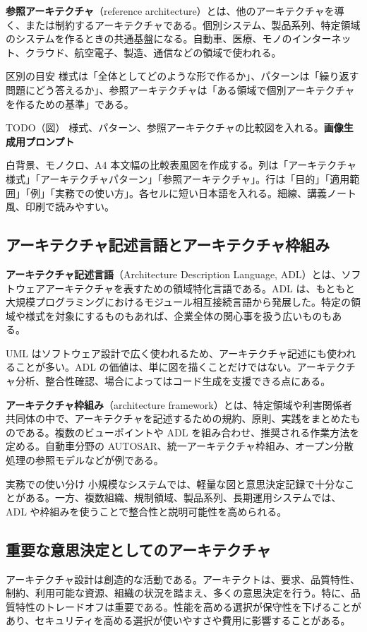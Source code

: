 \documentclass[a4paper,11pt]{ltjsarticle}
\newcommand{\todofig}[2]{\begin{statementbox}{TODO（図） #1}\textbf{画像生成用プロンプト}\par #2\end{statementbox}}
\newcommand{\keyterm}[1]{\textbf{#1}}
\newcommand{\en}[1]{（#1）}
\begin{document}
\keyterm{参照アーキテクチャ}\en{reference architecture}とは、他のアーキテクチャを導く、または制約するアーキテクチャである。個別システム、製品系列、特定領域のシステムを作るときの共通基盤になる。自動車、医療、モノのインターネット、クラウド、航空電子、製造、通信などの領域で使われる。

\begin{statementbox}{区別の目安}
様式は「全体としてどのような形で作るか」、パターンは「繰り返す問題にどう答えるか」、参照アーキテクチャは「ある領域で個別アーキテクチャを作るための基準」である。
\end{statementbox}

\todofig{様式、パターン、参照アーキテクチャの比較図を入れる。}{白背景、モノクロ、A4 本文幅の比較表風図を作成する。列は「アーキテクチャ様式」「アーキテクチャパターン」「参照アーキテクチャ」。行は「目的」「適用範囲」「例」「実務での使い方」。各セルに短い日本語を入れる。細線、講義ノート風、印刷で読みやすい。}

\subsection{アーキテクチャ記述言語とアーキテクチャ枠組み}
\keyterm{アーキテクチャ記述言語}\en{Architecture Description Language, ADL}とは、ソフトウェアアーキテクチャを表すための領域特化言語である。ADL は、もともと大規模プログラミングにおけるモジュール相互接続言語から発展した。特定の領域や様式を対象にするものもあれば、企業全体の関心事を扱う広いものもある。

UML はソフトウェア設計で広く使われるため、アーキテクチャ記述にも使われることが多い。ADL の価値は、単に図を描くことだけではない。アーキテクチャ分析、整合性確認、場合によってはコード生成を支援できる点にある。

\keyterm{アーキテクチャ枠組み}\en{architecture framework}とは、特定領域や利害関係者共同体の中で、アーキテクチャを記述するための規約、原則、実践をまとめたものである。複数のビューポイントや ADL を組み合わせ、推奨される作業方法を定める。自動車分野の AUTOSAR、統一アーキテクチャ枠組み、オープン分散処理の参照モデルなどが例である。

\begin{statementbox}{実務での使い分け}
小規模なシステムでは、軽量な図と意思決定記録で十分なことがある。一方、複数組織、規制領域、製品系列、長期運用システムでは、ADL や枠組みを使うことで整合性と説明可能性を高められる。
\end{statementbox}

\subsection{重要な意思決定としてのアーキテクチャ}
アーキテクチャ設計は創造的な活動である。アーキテクトは、要求、品質特性、制約、利用可能な資源、組織の状況を踏まえ、多くの意思決定を行う。特に、品質特性のトレードオフは重要である。性能を高める選択が保守性を下げることがあり、セキュリティを高める選択が使いやすさや費用に影響することがある。
\end{document}
